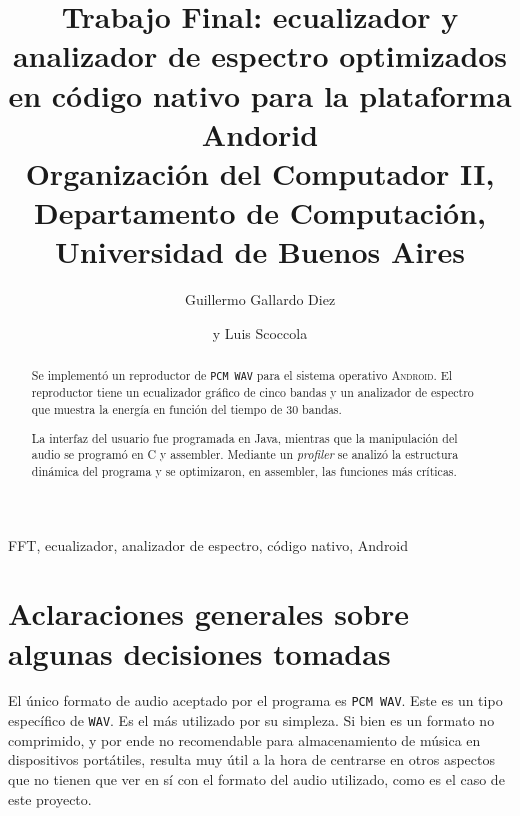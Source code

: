 \documentclass[%
    compressed,
    titlepage,
    narroweqnarray,
    inline,
    twoside,
    ]{ieee}
\begin{document}
\title[Ecualizador y analizador de espectro optimizados en c\'odigo nativo]{%
    Trabajo Final: ecualizador y analizador de espectro optimizados en c\'odigo nativo para la plataforma Andorid\\
{\small Organizaci\'on del Computador II, Departamento de Computaci\'on, Universidad de Buenos Aires}
}

\author[G. DIEZ Y SCOCCOLA]{
Guillermo Gallardo Diez\and{}y Luis Scoccola
}



\maketitle               

\tableofcontents

\newpage




%
%
%
%


\begin{abstract} 

Se implement\'o un reproductor de \texttt{PCM WAV} para el sistema operativo \textsc{Android}.
El reproductor tiene un ecualizador gr\'afico de cinco bandas y un analizador de
espectro que muestra la energ\'ia en funci\'on del tiempo de $30$ bandas.

La interfaz del usuario fue programada en Java, mientras que la manipulaci\'on
del audio se program\'o en C y assembler.
Mediante un \textit{profiler} se analiz\'o la estructura din\'amica del programa
y se optimizaron, en assembler, las funciones m\'as cr\'iticas.

\end{abstract}

\begin{keywords}
    FFT, ecualizador, analizador de espectro, c\'odigo nativo, Android
\end{keywords}



\section{Aclaraciones generales sobre algunas decisiones tomadas}

El \'unico formato de audio aceptado por el programa es \texttt{PCM WAV}. Este es un tipo
espec\'ifico de \texttt{WAV}. Es el m\'as utilizado por su simpleza. Si bien es un formato
no comprimido, y por ende no recomendable para almacenamiento de m\'usica en dispositivos
port\'atiles, resulta muy \'util a la hora de centrarse en otros aspectos que no tienen
que ver en s\'i con el formato del audio utilizado, como es el caso de este proyecto.
\end{document}
